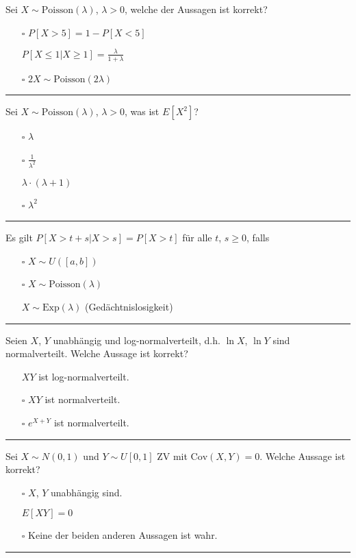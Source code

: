 \begin{tiny}
Sei $X \sim \text{Poisson}(\lambda)$, $\lambda > 0$, welche der Aussagen ist korrekt?
\begin{itemize}
    \item[$\square$] $P[X > 5] = 1 - P[X < 5]$
    \item[\checkmark] $P[X \leq 1|X \geq 1] = \frac{\lambda}{1 + \lambda}$
    \item[$\square$] $2X \sim \text{Poisson}(2\lambda)$
\end{itemize}
\rule{\linewidth}{0.4pt}

Sei $X \sim \text{Poisson}(\lambda)$, $\lambda > 0$, was ist $E[X^2]$?
\begin{itemize}
    \item[$\square$] $\lambda$
    \item[$\square$] $\frac{1}{\lambda^2}$
    \item[\checkmark] $\lambda \cdot (\lambda + 1)$
    \item[$\square$] $\lambda^2$
\end{itemize}
\rule{\linewidth}{0.4pt}

Es gilt $P[X > t + s | X > s] = P[X > t]$ für alle $t$, $s \geq 0$, falls
\begin{itemize}
    \item[$\square$] $X \sim U([a, b])$
    \item[$\square$] $X \sim \text{Poisson}(\lambda)$
    \item[\checkmark] $X \sim \text{Exp}(\lambda)$ (Gedächtnislosigkeit)
\end{itemize}
\rule{\linewidth}{0.4pt}

Seien $X$, $Y$ unabhängig und log-normalverteilt, d.h. $\ln X$, $\ln Y$ sind normalverteilt. Welche Aussage ist korrekt?
\begin{itemize}
    \item[\checkmark] $XY$ ist log-normalverteilt.
    \item[$\square$] $XY$ ist normalverteilt.
    \item[$\square$] $e^{X+Y}$ ist normalverteilt.
\end{itemize}
\rule{\linewidth}{0.4pt}

Sei $X \sim N(0, 1)$ und $Y \sim U[0, 1]$ ZV mit $\text{Cov}(X, Y) = 0$. Welche Aussage ist korrekt?
\begin{itemize}
    \item[$\square$] $X$, $Y$ unabhängig sind.
    \item[\checkmark] $E[XY] = 0$
    \item[$\square$] Keine der beiden anderen Aussagen ist wahr.
\end{itemize}
\rule{\linewidth}{0.4pt}


\end{tiny}
